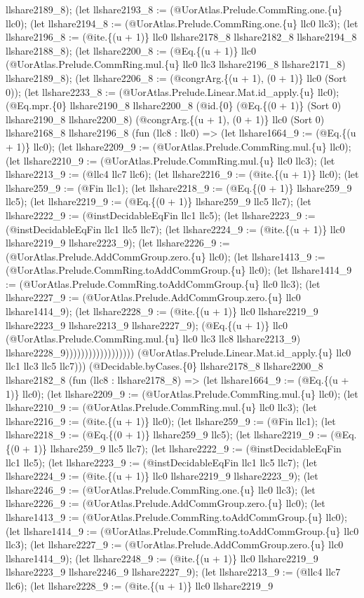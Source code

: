 \documentclass[11pt]{article}
\begin{document}
llshare2189\_8); (let llshare2193\_8 := (@UorAtlas.Prelude.CommRing.one.\{u\} llc0); (let llshare2194\_8 := (@UorAtlas.Prelude.CommRing.one.\{u\} llc0 llc3); (let llshare2196\_8 := (@ite.\{(u + 1)\} llc0 llshare2178\_8 llshare2182\_8 llshare2194\_8 llshare2188\_8); (let llshare2200\_8 := (@Eq.\{(u + 1)\} llc0 (@UorAtlas.Prelude.CommRing.mul.\{u\} llc0 llc3 llshare2196\_8 llshare2171\_8) llshare2189\_8); (let llshare2206\_8 := (@congrArg.\{(u + 1), (0 + 1)\} llc0 (Sort 0)); (let llshare2233\_8 := (@UorAtlas.Prelude.Linear.Mat.id\_apply.\{u\} llc0); (@Eq.mpr.\{0\} llshare2190\_8 llshare2200\_8 (@id.\{0\} (@Eq.\{(0 + 1)\} (Sort 0) llshare2190\_8 llshare2200\_8) (@congrArg.\{(u + 1), (0 + 1)\} llc0 (Sort 0) llshare2168\_8 llshare2196\_8 (fun (llc8 : llc0) => (let llshare1664\_9 := (@Eq.\{(u + 1)\} llc0); (let llshare2209\_9 := (@UorAtlas.Prelude.CommRing.mul.\{u\} llc0); (let llshare2210\_9 := (@UorAtlas.Prelude.CommRing.mul.\{u\} llc0 llc3); (let llshare2213\_9 := (@llc4 llc7 llc6); (let llshare2216\_9 := (@ite.\{(u + 1)\} llc0); (let llshare259\_9 := (@Fin llc1); (let llshare2218\_9 := (@Eq.\{(0 + 1)\} llshare259\_9 llc5); (let llshare2219\_9 := (@Eq.\{(0 + 1)\} llshare259\_9 llc5 llc7); (let llshare2222\_9 := (@instDecidableEqFin llc1 llc5); (let llshare2223\_9 := (@instDecidableEqFin llc1 llc5 llc7); (let llshare2224\_9 := (@ite.\{(u + 1)\} llc0 llshare2219\_9 llshare2223\_9); (let llshare2226\_9 := (@UorAtlas.Prelude.AddCommGroup.zero.\{u\} llc0); (let llshare1413\_9 := (@UorAtlas.Prelude.CommRing.toAddCommGroup.\{u\} llc0); (let llshare1414\_9 := (@UorAtlas.Prelude.CommRing.toAddCommGroup.\{u\} llc0 llc3); (let llshare2227\_9 := (@UorAtlas.Prelude.AddCommGroup.zero.\{u\} llc0 llshare1414\_9); (let llshare2228\_9 := (@ite.\{(u + 1)\} llc0 llshare2219\_9 llshare2223\_9 llshare2213\_9 llshare2227\_9); (@Eq.\{(u + 1)\} llc0 (@UorAtlas.Prelude.CommRing.mul.\{u\} llc0 llc3 llc8 llshare2213\_9) llshare2228\_9)))))))))))))))))) (@UorAtlas.Prelude.Linear.Mat.id\_apply.\{u\} llc0 llc1 llc3 llc5 llc7))) (@Decidable.byCases.\{0\} llshare2178\_8 llshare2200\_8 llshare2182\_8 (fun (llc8 : llshare2178\_8) => (let llshare1664\_9 := (@Eq.\{(u + 1)\} llc0); (let llshare2209\_9 := (@UorAtlas.Prelude.CommRing.mul.\{u\} llc0); (let llshare2210\_9 := (@UorAtlas.Prelude.CommRing.mul.\{u\} llc0 llc3); (let llshare2216\_9 := (@ite.\{(u + 1)\} llc0); (let llshare259\_9 := (@Fin llc1); (let llshare2218\_9 := (@Eq.\{(0 + 1)\} llshare259\_9 llc5); (let llshare2219\_9 := (@Eq.\{(0 + 1)\} llshare259\_9 llc5 llc7); (let llshare2222\_9 := (@instDecidableEqFin llc1 llc5); (let llshare2223\_9 := (@instDecidableEqFin llc1 llc5 llc7); (let llshare2224\_9 := (@ite.\{(u + 1)\} llc0 llshare2219\_9 llshare2223\_9); (let llshare2246\_9 := (@UorAtlas.Prelude.CommRing.one.\{u\} llc0 llc3); (let llshare2226\_9 := (@UorAtlas.Prelude.AddCommGroup.zero.\{u\} llc0); (let llshare1413\_9 := (@UorAtlas.Prelude.CommRing.toAddCommGroup.\{u\} llc0); (let llshare1414\_9 := (@UorAtlas.Prelude.CommRing.toAddCommGroup.\{u\} llc0 llc3); (let llshare2227\_9 := (@UorAtlas.Prelude.AddCommGroup.zero.\{u\} llc0 llshare1414\_9); (let llshare2248\_9 := (@ite.\{(u + 1)\} llc0 llshare2219\_9 llshare2223\_9 llshare2246\_9 llshare2227\_9); (let llshare2213\_9 := (@llc4 llc7 llc6); (let llshare2228\_9 := (@ite.\{(u + 1)\} llc0 llshare2219\_9 
\end{document}
